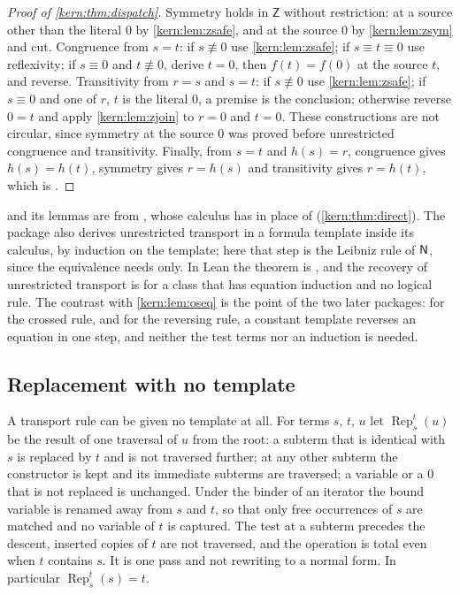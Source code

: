 \begin{proof}[Proof of \cref{kern:thm:dispatch}]
Symmetry holds in $\mathsf{Z}$ without restriction: at a source other than
the literal $0$ by \cref{kern:lem:zsafe}, and at the source $0$ by
\cref{kern:lem:zsym} and cut.  Congruence from $s=t$: if $s\not\equiv 0$
use \cref{kern:lem:zsafe}; if $s\equiv t\equiv 0$ use reflexivity; if
$s\equiv 0$ and $t\not\equiv 0$, derive $t=0$, then $f(t)=f(0)$ at the
source $t$, and reverse.  Transitivity from $r=s$ and $s=t$: if
$s\not\equiv 0$ use \cref{kern:lem:zsafe}; if $s\equiv 0$ and one of $r$,
$t$ is the literal $0$, a premise is the conclusion; otherwise reverse
$0=t$ and apply \cref{kern:lem:zjoin} to $r=0$ and $t=0$.  These
constructions are not circular, since symmetry at the source $0$ was proved
before unrestricted congruence and transitivity.  Finally, from $s=t$ and
$h(s)=r$, congruence gives $h(s)=h(t)$, symmetry gives $r=h(s)$ and
transitivity gives $r=h(t)$, which is .
\end{proof}

\begin{remark}
\label{kern:rem:dispatch-sources}
 and its lemmas are from ,
whose calculus has  in place of 
(\cref{kern:thm:direct}).  The package also derives unrestricted transport
in a formula template inside its calculus, by induction on the template;
here that step is the Leibniz rule of $\mathsf{N}$, since the equivalence needs
 only.  In Lean the theorem is , and the
recovery of unrestricted transport is  for a class
 that has equation induction and no logical rule.  The
contrast with \cref{kern:lem:oseq} is the point of the two later packages:
for the crossed rule, and for the reversing rule, a constant template
reverses an equation in one step, and neither the test terms nor an
induction is needed.
\end{remark}

\subsection{Replacement with no template}
\label{kern:sec:tfree}

A transport rule can be given no template at all.  For terms $s$, $t$, $u$
let $\operatorname{Rep}_{s}^{t}(u)$ be the result of one traversal of $u$
from the root: a subterm that is identical with $s$ is replaced by $t$ and
is not traversed further; at any other subterm the constructor is kept and
its immediate subterms are traversed; a variable or a $0$ that is not
replaced is unchanged.  Under the binder of an iterator the bound variable is
renamed away from $s$ and $t$, so that only free occurrences of $s$ are
matched and no variable of $t$ is captured.  The test at a subterm precedes
the descent, inserted copies of $t$ are not traversed, and the operation is
total even when $t$ contains $s$.  It is one pass and not rewriting to a
normal form.  In particular $\operatorname{Rep}_{s}^{t}(s)=t$.

